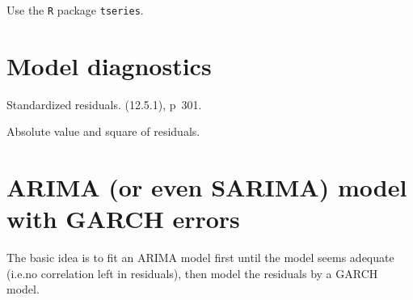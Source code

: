 \documentclass[12pt]{article}
\begin{document}
Use the \texttt{R} package \texttt{tseries}.

\section{Model diagnostics}

Standardized residuals. (12.5.1), p~301.

Absolute value and square of residuals.

\section{ARIMA (or even SARIMA) model with GARCH errors}

The basic idea is to fit an ARIMA model first until the model seems
adequate (i.e.\@ no correlation left in residuals),
then model the residuals by a GARCH model.
\end{document}
